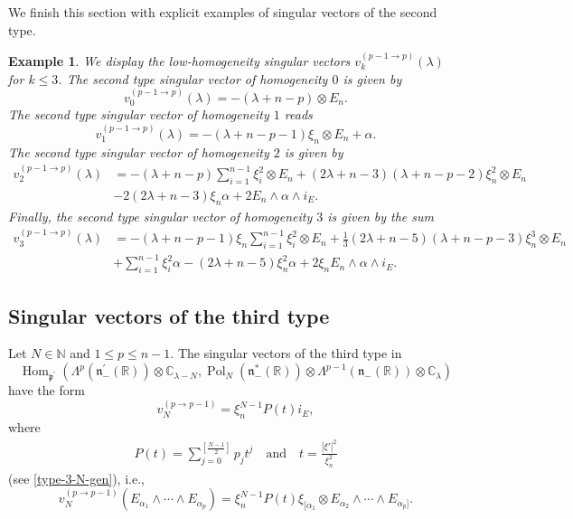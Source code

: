 \documentclass[a4paper,12pt,reqno]{amsart}
\newtheorem{example}[theorem]{Example}
\numberwithin{theorem}{subsection}
\numberwithin{equation}{section}
\begin{document}
We finish this section with explicit examples of singular vectors of the second
type.

\begin{example}\label{ExamplesPtoP-1} We display the low-homogeneity singular vectors
$v_k^{(p-1 \to p)}(\lambda)$ for $k \le 3$. The second type singular vector of
homogeneity $0$ is given by
$$
   v_0^{(p-1 \to p)}(\lambda) = -(\lambda\!+\!n\!-\!p) \otimes E_n.
$$
The second type singular vector of homogeneity $1$ reads
\begin{equation*}
   v_1^{(p-1\to p)}(\lambda) = -(\lambda\!+\!n\!-\!p\!-\!1) \xi_n \otimes E_n + \alpha.
\end{equation*}
The second type singular vector of homogeneity $2$ is given by
\begin{align*}
   v_2^{(p-1\to p)}(\lambda) & = -(\lambda\!+\!n\!-\!p)\sum_{i=1}^{n-1}\xi_i^2 \otimes E_n
   + (2\lambda\!+\!n\!-\!3)(\lambda\!+\!n\!-\!p\!-\!2)\xi_n^2 \otimes E_n \\
   & -2(2\lambda\!+\!n\!-\!3) \xi_n \alpha + 2 E_n \wedge \alpha \wedge i_E.
\end{align*}
Finally, the second type singular vector of homogeneity $3$ is given by the sum
\begin{align*}
   v_3^{(p-1\to p)}(\lambda) & = - (\lambda\!+\!n\!-\!p\!-\!1) \xi_n\sum_{i=1}^{n-1}\xi_i^2 \otimes E_n
   + \tfrac{1}{3} (2\lambda\!+\!n\!-\!5)(\lambda\!+\!n\!-\!p\!-\!3) \xi_n^3
   \otimes E_n \\
   & + \sum_{i=1}^{n-1}\xi_i^2 \alpha - (2\lambda\!+\!n\!-\!5) \xi_n^2 \alpha +2 \xi_n E_n \wedge \alpha \wedge i_E.
\end{align*}
\end{example}

\subsection{Singular vectors of the third type}\label{sv-type-3}

Let $N \in {\mathbb{N}}$ and $1 \leq p \leq n-1$. The singular vectors of the third type
in
$$
   {\operatorname{Hom}}_{{{\mathfrak p}}^\prime}(\Lambda^p({{\mathfrak n}}_-^\prime({\mathbb{R}})) \otimes {\mathbb{C}}_{\lambda-N},
   {\operatorname{Pol}}_N({{\mathfrak n}}_-^*({\mathbb{R}})) \otimes \Lambda^{p-1}({{\mathfrak n}}_-({\mathbb{R}})) \otimes {\mathbb{C}}_\lambda)
$$
have the form
\begin{equation}\label{eq:HOM1}
   v^{(p\to p-1)}_N = \xi_n^{N-1} P(t) i_E,
\end{equation}
where
\begin{align*}
   P(t) = \sum_{j=0}^{\left[\frac{N-1}{2}\right]} p_j t^j \quad \mbox{and} \quad
   t = \frac{|\xi'|^2}{\xi_n^2}
\end{align*}
(see \eqref{type-3-N-gen}), i.e.,
\begin{equation*}
   v^{(p\to p-1)}_N (E_{\alpha_1} \wedge \cdots \wedge E_{\alpha_p})
   = \xi_n^{N-1} P(t) \xi_{[\alpha_1} \otimes E_{\alpha_2} \wedge \cdots \wedge
   E_{\alpha_{p}]}.
\end{equation*}
\end{document}
